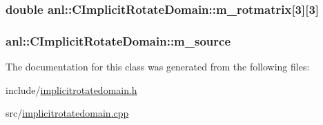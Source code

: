 \label{classanl_1_1CImplicitRotateDomain_aef2125375f4cd5a477cc69dad7750479}
\hypertarget{classanl_1_1CImplicitRotateDomain_a9bd8244857bad0dbe9c81095934b1fa1}{
\subsubsection[{m\_\-rotmatrix}]{\setlength{\rightskip}{0pt plus 5cm}double {\bf anl::CImplicitRotateDomain::m\_\-rotmatrix}\mbox{[}3\mbox{]}\mbox{[}3\mbox{]}}}
\label{classanl_1_1CImplicitRotateDomain_a9bd8244857bad0dbe9c81095934b1fa1}
\hypertarget{classanl_1_1CImplicitRotateDomain_a9cfd7f532e1e1449e16707f37b7d083b}{
\subsubsection[{m\_\-source}]{ {\bf anl::CImplicitRotateDomain::m\_\-source}}}
\label{classanl_1_1CImplicitRotateDomain_a9cfd7f532e1e1449e16707f37b7d083b}


The documentation for this class was generated from the following files:\begin{DoxyCompactItemize}
\item 
include/\hyperlink{implicitrotatedomain_8h}{implicitrotatedomain.h}\item 
src/\hyperlink{implicitrotatedomain_8cpp}{implicitrotatedomain.cpp}\end{DoxyCompactItemize}
